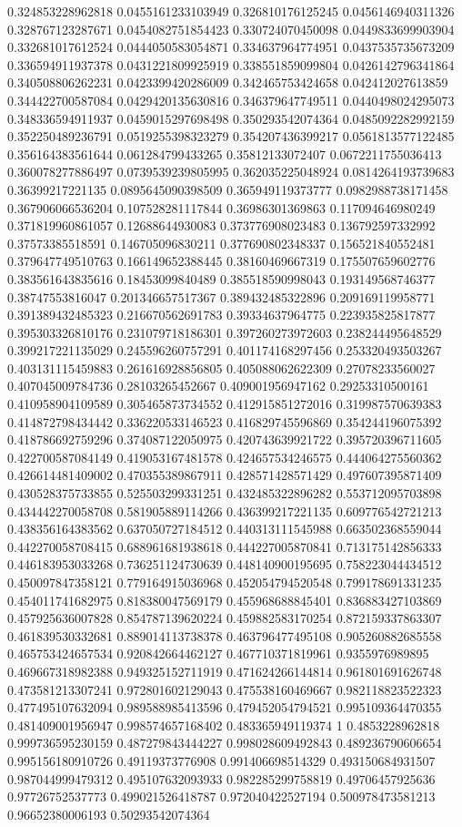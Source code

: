 \begin{table}
\begin{tabu}
\begin{sparkline}{10}
0.324853228962818 0.0455161233103949 0.326810176125245 0.0456146940311326 0.328767123287671 0.0454082751854423 0.330724070450098 0.0449833699903904 0.332681017612524 0.0444050583054871 0.334637964774951 0.0437535735673209 0.336594911937378 0.0431221809925919 0.338551859099804 0.0426142796341864 0.340508806262231 0.0423399420286009 0.342465753424658 0.042412027613859 0.344422700587084 0.0429420135630816 0.346379647749511 0.0440498024295073 0.348336594911937 0.0459015297698498 0.350293542074364 0.0485092282992159 0.352250489236791 0.0519255398323279 0.354207436399217 0.0561813577122485 0.356164383561644 0.061284799433265 0.35812133072407 0.0672211755036413 0.360078277886497 0.0739539239805995 0.362035225048924 0.0814264193739683 0.36399217221135 0.0895645090398509 0.365949119373777 0.0982988738171458 0.367906066536204 0.107528281117844 0.36986301369863 0.117094646980249 0.371819960861057 0.12688644930083 0.373776908023483 0.136792597332992 0.37573385518591 0.146705096830211 0.377690802348337 0.156521840552481 0.379647749510763 0.166149652388445 0.38160469667319 0.175507659602776 0.383561643835616 0.18453099840489 0.385518590998043 0.193149568746377 0.38747553816047 0.201346657517367 0.389432485322896 0.209169119958771 0.391389432485323 0.216670562691783 0.39334637964775 0.223935825817877 0.395303326810176 0.231079718186301 0.397260273972603 0.238244495648529 0.399217221135029 0.245596260757291 0.401174168297456 0.253320493503267 0.403131115459883 0.261616928856805 0.405088062622309 0.27078233560027 0.407045009784736 0.28103265452667 0.409001956947162 0.29253310500161 0.410958904109589 0.305465873734552 0.412915851272016 0.319987570639383 0.414872798434442 0.336220533146523 0.416829745596869 0.354244196075392 0.418786692759296 0.374087122050975 0.420743639921722 0.395720396711605 0.422700587084149 0.419053167481578 0.424657534246575 0.444064275560362 0.426614481409002 0.470355389867911 0.428571428571429 0.497607395871409 0.430528375733855 0.525503299331251 0.432485322896282 0.553712095703898 0.434442270058708 0.581905889114266 0.436399217221135 0.609776542721213 0.438356164383562 0.637050727184512 0.440313111545988 0.663502368559044 0.442270058708415 0.688961681938618 0.444227005870841 0.713175142856333 0.446183953033268 0.736251124730639 0.448140900195695 0.758223044434512 0.450097847358121 0.779164915036968 0.452054794520548 0.799178691331235 0.454011741682975 0.818380047569179 0.455968688845401 0.836883427103869 0.457925636007828 0.854787139620224 0.459882583170254 0.872159337863307 0.461839530332681 0.889014113738378 0.463796477495108 0.905260882685558 0.465753424657534 0.920842664462127 0.467710371819961 0.9355976989895 0.469667318982388 0.949325152711919 0.471624266144814 0.961801691626748 0.473581213307241 0.972801602129043 0.475538160469667 0.982118823522323 0.477495107632094 0.989588985413596 0.479452054794521 0.995109364470355 0.481409001956947 0.998574657168402 0.483365949119374 1 0.4853228962818 0.999736595230159 0.487279843444227 0.998028609492843 0.489236790606654 0.995156180910726 0.49119373776908 0.991406698514329 0.493150684931507 0.987044999479312 0.495107632093933 0.982285299758819 0.49706457925636 0.97726752537773 0.499021526418787 0.972040422527194 0.500978473581213 0.96652380006193 0.50293542074364 
\end{sparkline}
\end{tabu}
\end{table}
